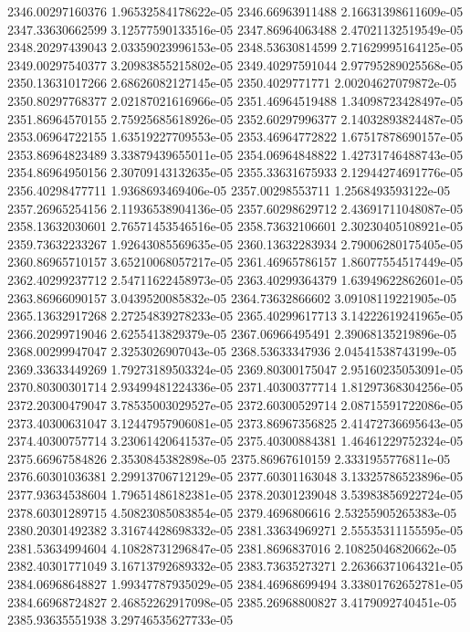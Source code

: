 {2346.00297160376 1.96532584178622e-05
2346.66963911488 2.16631398611609e-05
2347.33630662599 3.12577590133516e-05
2347.86964063488 2.47021132519549e-05
2348.20297439043 2.03359023996153e-05
2348.53630814599 2.71629995164125e-05
2349.00297540377 3.20983855215802e-05
2349.40297591044 2.97795289025568e-05
2350.13631017266 2.68626082127145e-05
2350.4029771771 2.00204627079872e-05
2350.80297768377 2.02187021616966e-05
2351.46964519488 1.34098723428497e-05
2351.86964570155 2.75925685618926e-05
2352.60297996377 2.14032893824487e-05
2353.06964722155 1.63519227709553e-05
2353.46964772822 1.67517878690157e-05
2353.86964823489 3.33879439655011e-05
2354.06964848822 1.42731746488743e-05
2354.86964950156 2.30709143132635e-05
2355.33631675933 2.12944274691776e-05
2356.40298477711 1.9368693469406e-05
2357.00298553711 1.2568493593122e-05
2357.26965254156 2.11936538904136e-05
2357.60298629712 2.43691711048087e-05
2358.13632030601 2.76571453546516e-05
2358.73632106601 2.30230405108921e-05
2359.73632233267 1.92643085569635e-05
2360.13632283934 2.79006280175405e-05
2360.86965710157 3.65210068057217e-05
2361.46965786157 1.86077554517449e-05
2362.40299237712 2.54711622458973e-05
2363.40299364379 1.63949622862601e-05
2363.86966090157 3.0439520085832e-05
2364.73632866602 3.09108119221905e-05
2365.13632917268 2.27254839278233e-05
2365.40299617713 3.14222619241965e-05
2366.20299719046 2.6255413829379e-05
2367.06966495491 2.39068135219896e-05
2368.00299947047 2.3253026907043e-05
2368.53633347936 2.04541538743199e-05
2369.33633449269 1.79273189503324e-05
2369.80300175047 2.95160235053091e-05
2370.80300301714 2.93499481224336e-05
2371.40300377714 1.81297368304256e-05
2372.20300479047 3.78535003029527e-05
2372.60300529714 2.08715591722086e-05
2373.40300631047 3.12447957906081e-05
2373.86967356825 2.41472736695643e-05
2374.40300757714 3.23061420641537e-05
2375.40300884381 1.46461229752324e-05
2375.66967584826 2.3530845382898e-05
2375.86967610159 2.3331955776811e-05
2376.60301036381 2.29913706712129e-05
2377.60301163048 3.13325786523896e-05
2377.93634538604 1.79651486182381e-05
2378.20301239048 3.53983856922724e-05
2378.60301289715 4.50823085083854e-05
2379.4696806616 2.53255905265383e-05
2380.20301492382 3.31674428698332e-05
2381.33634969271 2.55535311155595e-05
2381.53634994604 4.10828731296847e-05
2381.8696837016 2.10825046820662e-05
2382.40301771049 3.16713792689332e-05
2383.73635273271 2.26366371064321e-05
2384.06968648827 1.99347787935029e-05
2384.46968699494 3.33801762652781e-05
2384.66968724827 2.46852262917098e-05
2385.26968800827 3.4179092740451e-05
2385.93635551938 3.29746535627733e-05
}
